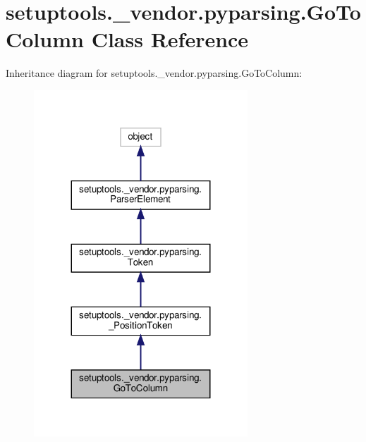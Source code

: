 \hypertarget{classsetuptools_1_1__vendor_1_1pyparsing_1_1GoToColumn}{}\section{setuptools.\+\_\+vendor.\+pyparsing.\+Go\+To\+Column Class Reference}
\label{classsetuptools_1_1__vendor_1_1pyparsing_1_1GoToColumn}


Inheritance diagram for setuptools.\+\_\+vendor.\+pyparsing.\+Go\+To\+Column\+:
\nopagebreak
\begin{figure}[H]
\begin{center}
\leavevmode
\includegraphics[width=227pt]{classsetuptools_1_1__vendor_1_1pyparsing_1_1GoToColumn__inherit__graph}
\end{center}
\end{figure}


